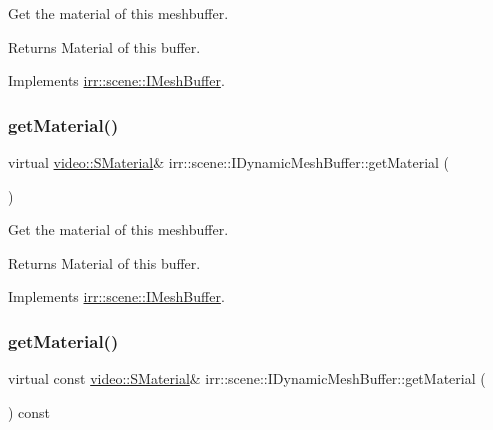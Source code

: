 Get the material of this meshbuffer. 

\begin{DoxyReturn}{Returns}
Material of this buffer. 
\end{DoxyReturn}


Implements \hyperlink{classirr_1_1scene_1_1IMeshBuffer_a26fd922f00fde56abbbbbe40b485238b}{irr\+::scene\+::\+I\+Mesh\+Buffer}.

\mbox{\label{classirr_1_1scene_1_1IDynamicMeshBuffer_a6ed3a5ce948ebef063b7ea9e07974eb7}} 
\subsubsection{\texorpdfstring{get\+Material()}{getMaterial()}\hspace{0.1cm}{\footnotesize\ttfamily [2/4]}}
{\footnotesize\ttfamily virtual \hyperlink{classirr_1_1video_1_1SMaterial}{video\+::\+S\+Material}\& irr\+::scene\+::\+I\+Dynamic\+Mesh\+Buffer\+::get\+Material (\begin{DoxyParamCaption}{ }\end{DoxyParamCaption})\hspace{0.3cm}{\ttfamily [pure virtual]}}



Get the material of this meshbuffer. 

\begin{DoxyReturn}{Returns}
Material of this buffer. 
\end{DoxyReturn}


Implements \hyperlink{classirr_1_1scene_1_1IMeshBuffer_a26fd922f00fde56abbbbbe40b485238b}{irr\+::scene\+::\+I\+Mesh\+Buffer}.

\mbox{\label{classirr_1_1scene_1_1IDynamicMeshBuffer_a3be83e4819e9f79a3d9b264eb8bf4cfc}} 
\subsubsection{\texorpdfstring{get\+Material()}{getMaterial()}\hspace{0.1cm}{\footnotesize\ttfamily [3/4]}}
{\footnotesize\ttfamily virtual const \hyperlink{classirr_1_1video_1_1SMaterial}{video\+::\+S\+Material}\& irr\+::scene\+::\+I\+Dynamic\+Mesh\+Buffer\+::get\+Material (\begin{DoxyParamCaption}{ }\end{DoxyParamCaption}) const\hspace{0.3cm}{\ttfamily [pure virtual]}}



